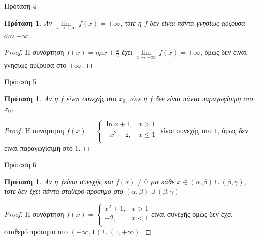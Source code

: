 \documentclass[greek]{beamer}
\newtheorem{proposition}[theorem]{Πρόταση}
\begin{document}
\begin{frame}{Πρόταση 4}
 \begin{proposition}
  \normalfont Αν $\underset{x\to +\infty }{\mathop{\lim }}\,f\left( x \right)=+\infty $, τότε η $f$ δεν είναι πάντα γνησίως αύξουσα στο $+\infty $.
 \end{proposition}
 \begin{proof}
  Η συνάρτηση $f\left( x \right)=\eta \mu x+\frac{x}{2}$ έχει $\underset{x\to +\infty }{\mathop{\lim }}\,f\left( x \right)=+\infty $, όμως δεν είναι γνησίως αύξουσα στο $+\infty $.
 \end{proof}
\end{frame}

\begin{frame}{Πρόταση 5}
 \begin{proposition}
  \normalfont Αν η $f$ είναι συνεχής στο ${{x}_{0}}$, τότε η $f$ δεν είναι πάντα παραγωγίσιμη στο ${{x}_{0}}$.
 \end{proposition}
 \begin{proof}
  Η συνάρτηση $f\left( x \right)=\left\{ \begin{array}{*{35}{l}}
    \ln x+1,      & x>1    \\
    -{{x}^{2}}+2, & x\le 1 \\
   \end{array} \right.$ είναι συνεχής στο $1$, όμως δεν είναι παραγωγίσιμη στο $1$.
 \end{proof}
\end{frame}

\begin{frame}{Πρόταση 6}
 \begin{proposition}
  \normalfont Αν η $f$είναι συνεχής και $f(x)\ne 0$ για κάθε $x\in (\alpha ,\beta )\cup (\beta ,\gamma )$, τότε δεν έχει πάντα σταθερό πρόσημο στο  $(\alpha ,\beta )\cup (\beta ,\gamma )$
 \end{proposition}
 \begin{proof}
  Η συνάρτηση $f\left( x \right)=\left\{ \begin{array}{*{35}{l}}
    {{x}^{2}}+1, & x>1 \\
    -2,          & x<1 \\
   \end{array} \right.$είναι συνεχής όμως δεν έχει σταθερό πρόσημο στο $(-\infty ,1)\cup (1,+\infty )$.

 \end{proof}
\end{frame}
\end{document}

